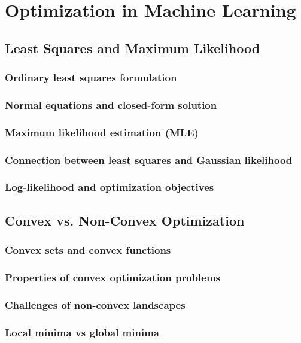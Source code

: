 \chapter{Optimization in Machine Learning}

\section{Least Squares and Maximum Likelihood}
\subsection{Ordinary least squares formulation}
\subsection{Normal equations and closed-form solution}
\subsection{Maximum likelihood estimation (MLE)}
\subsection{Connection between least squares and Gaussian likelihood}
\subsection{Log-likelihood and optimization objectives}

\section{Convex vs. Non-Convex Optimization}
\subsection{Convex sets and convex functions}
\subsection{Properties of convex optimization problems}
\subsection{Challenges of non-convex landscapes}
\subsection{Local minima vs global minima}
